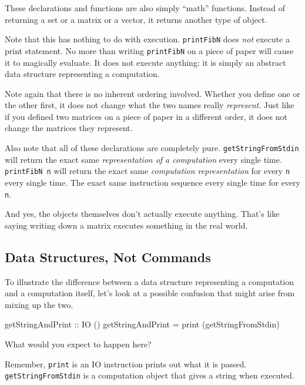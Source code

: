\documentclass[]{article}
\newenvironment{Shaded}{}{}
\newcommand{\DataTypeTok}[1]{\textcolor[rgb]{0.56,0.13,0.00}{#1}}
\newcommand{\FunctionTok}[1]{\textcolor[rgb]{0.02,0.16,0.49}{#1}}
\newcommand{\NormalTok}[1]{#1}
\newcommand{\OtherTok}[1]{\textcolor[rgb]{0.00,0.44,0.13}{#1}}
\begin{document}
These declarations and functions are also simply ``math'' functions. Instead of
returning a set or a matrix or a vector, it returns another type of object.

Note that this has nothing to do with execution. \texttt{printFibN} does
\emph{not} execute a print statement. No more than writing \texttt{printFibN} on
a piece of paper will cause it to magically evaluate. It does not execute
anything: it is simply an abstract data structure representing a computation.

Note again that there is no inherent ordering involved. Whether you define one
or the other first, it does not change what the two names really
\emph{represent}. Just like if you defined two matrices on a piece of paper in a
different order, it does not change the matrices they represent.

Also note that all of these declarations are completely pure.
\texttt{getStringFromStdin} will return the exact same \emph{representation of a
computation} every single time. \texttt{printFibN\ n} will return the exact same
\emph{computation representation} for every \texttt{n} every single time. The
exact same instruction sequence every single time for every \texttt{n}.

And yes, the objects themselves don't actually execute anything. That's like
saying writing down a matrix executes something in the real world.

\subsection{Data Structures, Not Commands}\label{data-structures-not-commands}

To illustrate the difference between a data structure representing a computation
and a computation itself, let's look at a possible confusion that might arise
from mixing up the two.

\begin{Shaded}
\begin{Highlighting}[]
\OtherTok{getStringAndPrint ::} \DataTypeTok{IO}\NormalTok{ ()}
\NormalTok{getStringAndPrint }\OtherTok{=} \FunctionTok{print}\NormalTok{ (getStringFromStdin)}
\end{Highlighting}
\end{Shaded}

What would you expect to happen here?

Remember, \texttt{print} is an IO instruction prints out what it is passed.
\texttt{getStringFromStdin} is a computation object that gives a string when
executed.
\end{document}
